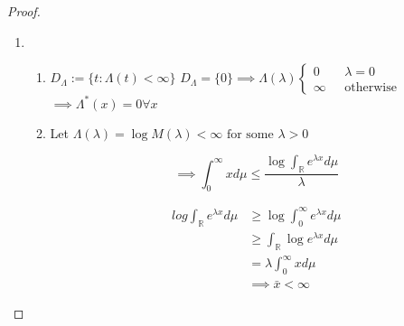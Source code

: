 \documentclass[11pt]{article}
\newcommand{\twopartdef}[4]
{
	\left\{
		\begin{array}{ll}
			#1 & \mbox{ } #2 \\
			#3 & \mbox{ } #4
		\end{array}
	\right.
}
\theoremstyle{break}
\newcommand{\re}{{\mathbb{R}}}
\begin{document}
\begin{proof}
\begin{enumerate}
\item
\begin{enumerate}
\item \( D_\Lambda  := \{t:\Lambda\left(t\right)<\infty \}\) 
\(D_\Lambda = \{0\} \implies \Lambda\left(\lambda\right) \twopartdef{0}{\lambda = 0}{\infty}{\text{otherwise}}\)
\\
\(\implies \Lambda^*\left(x\right) = 0 \forall x\)

\item Let \( \Lambda\left(\lambda\right) = \log{M\left(\lambda\right)} < \infty \text{ for some } \lambda > 0\)

\begin{equation}
\implies \int_0^{\infty} xd\mu \leq \frac{\log\int_{\re} e^{\lambda x}d\mu }{ \lambda}
\end{equation}

\begin{eqnarray}
log\int_{\re} e^{\lambda x}d\mu &\geq \log\int_{0}^{\infty} e^{\lambda x}d\mu\\
&\geq \int_{\re} \log{e^{\lambda x}}d\mu\\
&= \lambda \int_{0}^{\infty} x d\mu \\
&\implies \bar{x}<\infty
\end{eqnarray}

\end{enumerate}

\end{enumerate}

\end{proof}
\end{document}

